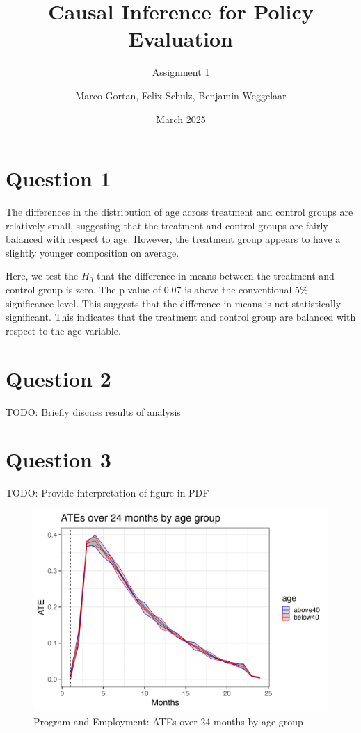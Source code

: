 \documentclass{scrartcl}
\title{Causal Inference for Policy Evaluation}
\subtitle{Assignment 1}
\author{Marco Gortan, Felix Schulz, Benjamin Weggelaar}
\date{March 2025}
\begin{document}
\maketitle

\section*{Question 1}



The differences in the distribution of age across treatment and control groups are relatively small, suggesting that the treatment and control groups are fairly balanced with respect to age. However, the treatment group appears to have a slightly younger composition on average.



Here, we test the $H_0$ that the difference in means between the treatment and control group is zero. The p-value of 0.07 is above the conventional 5\% significance level. This suggests that the difference in means is not statistically significant. This indicates that the treatment and control group are balanced with respect to the age variable.

\section*{Question 2}

% 

TODO: Briefly discuss results of analysis

\section*{Question 3}

TODO: Provide interpretation of figure in PDF

\begin{figure}
    \centering
    \includegraphics[width=0.7\linewidth]{ATEs_over_24_months_by_age_group.png}
    \caption{Program and Employment: ATEs over 24 months by age group}
    \label{fig:enter-label}
\end{figure}
\end{document}
